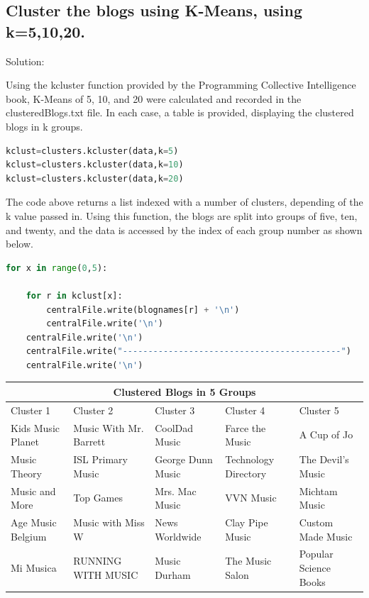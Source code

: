 \documentclass[11pt]{scrartcl} %
\begin{document}
\subsection*{  Cluster the blogs using K-Means, using k=5,10,20.}

\bigskip\bigskip
\LARGE Solution: \newline\newline\small


\tabto{2.0cm} Using the kcluster function provided by the Programming Collective Intelligence book, K-Means of 5, 10, and 20 were calculated and recorded in the clusteredBlogs.txt file. In each case, a table is provided, displaying the clustered blogs in k groups. 

\begin{lstlisting}[language = Python, caption= Clustering into 5 groups]
kclust=clusters.kcluster(data,k=5)
kclust=clusters.kcluster(data,k=10)
kclust=clusters.kcluster(data,k=20)
\end{lstlisting}

\tabto{2.0cm} The code above returns a list indexed with a number of clusters, depending of the k value passed in. Using this function, the blogs are split into groups of five, ten, and twenty, and the data is accessed by the index of each group number as shown below.

\begin{lstlisting}[language = Python, caption= Clustering into 5 groups]
for x in range(0,5):

	for r in kclust[x]:
		centralFile.write(blognames[r] + '\n')
		centralFile.write('\n')
	centralFile.write('\n')
	centralFile.write("-------------------------------------------")
	centralFile.write('\n')
\end{lstlisting}


\begin{flushleft}
\begin{tabular}{ |p{2.8cm}||p{3.5cm}||p{2.8cm}||p{3cm}||p{3cm}|}
 \hline
 \multicolumn{5}{|c|}{Clustered Blogs in 5 Groups} \\
 \hline
 Cluster 1 & Cluster 2 & Cluster 3 & Cluster 4 & Cluster 5\\
 \hline
  Kids Music Planet & Music With Mr. Barrett & CoolDad Music & Farce the Music & A Cup of Jo  \\
  Music Theory & ISL Primary Music & George Dunn Music & Technology Directory & The Devil's Music\\
  Music and More & Top Games & Mrs. Mac Music & VVN Music & Michtam Music\\
  Age Music Belgium & Music with Miss W & News Worldwide & Clay Pipe Music & Custom Made Music\\
  Mi Musica & RUNNING WITH MUSIC & Music Durham & The Music Salon & Popular Science Books \\
 \hline
\end{tabular}
\end{flushleft}
\end{document}
